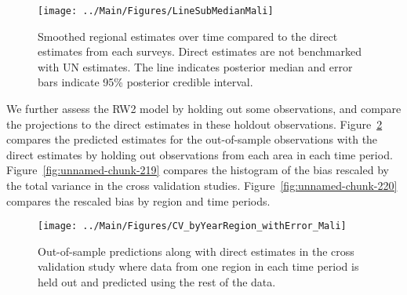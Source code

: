 \documentclass[12pt]{article}\usepackage[]{graphicx}\usepackage[]{color}
\newenvironment{knitrout}{}{} %
\begin{document}
\begin{knitrout}
\color{fgcolor}\begin{figure}[bht]

{\centering \texttt{[image: ../Main/Figures/LineSubMedianMali]} 

}

\caption[Smoothed regional estimates over time compared to the direct estimates from each surveys]{Smoothed regional estimates over time compared to the direct estimates from each surveys. Direct estimates are not benchmarked with UN estimates. The line indicates posterior median and error bars indicate 95\% posterior credible interval.}\label{fig:unnamed-chunk-217}
\end{figure}


\end{knitrout}
We further assess the RW2 model by holding out some observations, and compare the projections to the direct estimates in these holdout observations. Figure~\ref{fig:unnamed-chunk-218} compares the predicted estimates for the out-of-sample observations  with the direct estimates by holding out observations from each area in each time period.  Figure~\ref{fig:unnamed-chunk-219} compares the histogram of the bias rescaled by the total variance in the cross validation studies. Figure~\ref{fig:unnamed-chunk-220} compares the rescaled bias by region and time periods.



 
\begin{knitrout}
\color{fgcolor}\begin{figure}[bht]

{\centering \texttt{[image: ../Main/Figures/CV\_byYearRegion\_withError\_Mali]} 

}

\caption[Out-of-sample predictions along with direct estimates in the cross validation study where data from one region in each time period is held out and predicted using the rest of the data]{Out-of-sample predictions along with direct estimates in the cross validation study where data from one region in each time period is held out and predicted using the rest of the data.}\label{fig:unnamed-chunk-218}
\end{figure}


\end{knitrout}
\end{document}

